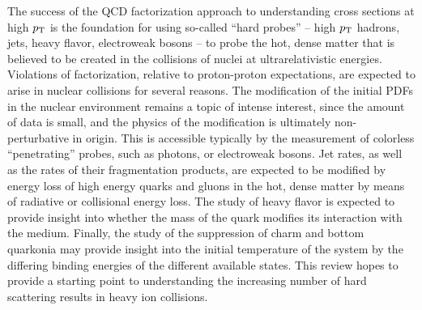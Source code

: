 The success of the QCD factorization approach to understanding cross sections at high $\mbox{$p_{\mathrm{T}}$}$
is the foundation for using so-called ``hard probes'' -- high $\mbox{$p_{\mathrm{T}}$}$ hadrons, jets, heavy flavor, electroweak bosons --
to probe the hot, dense matter that is believed to be created in the collisions of nuclei at 
ultrarelativistic energies.
Violations of factorization, relative to proton-proton expectations, are expected to arise in nuclear collisions
for several reasons. 
The modification of the initial PDFs in the nuclear environment remains a topic of intense interest, since
the amount of data is small, and the physics of the modification is ultimately non-perturbative in origin.
This is accessible typically by the measurement of colorless ``penetrating'' probes, such as photons, or electroweak
bosons.
Jet rates, as well as the rates of their fragmentation products, are expected to be modified by energy loss
of high energy quarks and gluons in the hot, dense matter by means of radiative or collisional energy loss.
The study of heavy flavor is expected to provide insight into whether the mass of the quark modifies its
interaction with the medium.  Finally, the study of the suppression of charm and bottom quarkonia may provide  
insight into the initial temperature of the system by the differing binding energies of the different
available states.
This review hopes to provide a starting point to understanding the increasing number of hard scattering results in
heavy ion collisions.
